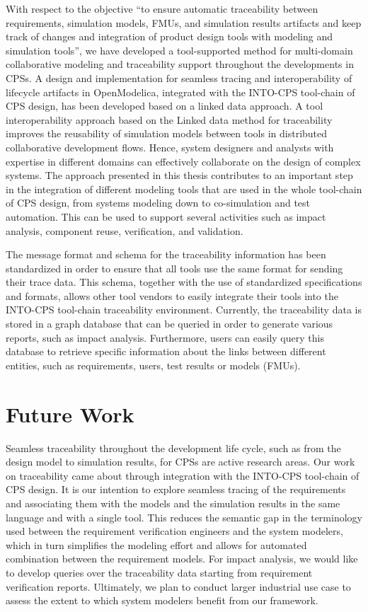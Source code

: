 With respect to the objective “to ensure automatic traceability between requirements, simulation models, FMUs, and simulation results artifacts and keep track of changes and integration of product design tools with modeling and simulation tools”, we have developed a tool-supported method for multi-domain collaborative modeling and traceability support throughout the developments in CPSs. A design and implementation for seamless tracing and interoperability of lifecycle artifacts in OpenModelica, integrated with the INTO-CPS tool-chain of CPS design, has been developed based on a linked data approach. A tool interoperability approach based on the Linked data method for traceability improves the reusability of simulation models between tools in distributed collaborative development flows. Hence, system designers and analysts with expertise in different domains can effectively collaborate on the design of complex systems. The approach presented in this thesis contributes to an important step in the integration of different modeling tools that are used in the whole tool-chain of CPS design, from systems modeling down to co-simulation and test automation. This can be used to support several activities such as impact analysis, component reuse, verification, and validation. 

The message format and schema for the traceability information has been standardized in order to ensure that all tools use the same format for sending their trace data. This schema, together with the use of standardized specifications and formats, allows other tool vendors to easily integrate their tools into the INTO-CPS tool-chain traceability environment. Currently, the traceability data is stored in a graph database that can be queried in order to generate various reports, such as impact analysis. Furthermore, users can easily query this database to retrieve specific information about the links between different entities, such as requirements, users, test results or models (FMUs).

\section{Future Work}
\label{sec:futurework}

Seamless traceability throughout the development life cycle, such as from the design model to simulation results, for CPSs are active research areas. 
Our work on traceability came about through integration with the INTO-CPS tool-chain of CPS design. 
It is our intention to explore seamless tracing of the requirements and associating them with the models and the simulation results 
in the same language and with a single tool. This reduces the semantic gap in the terminology used between the requirement verification engineers and 
the system modelers, which in turn simplifies the modeling effort and allows for automated combination between the requirement models.
For impact analysis, we would like to develop queries over the traceability data starting from requirement verification reports.
Ultimately, we plan to conduct larger industrial use case to assess the extent to which system modelers benefit from our framework.



